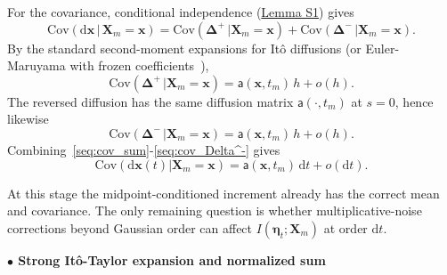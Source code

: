\documentclass[
 longbibliography,
 twocolumn,
 superscriptaddress,
 amsmath,
 amssymb,
 amsthm,
 amsfonts,
 prl,
 floatfix,
]{revtex4-2}
\newcommand{\matbf}[1]{\boldsymbol{\mathsf{#1}}}
\begin{document}
\begin{widetext}
For the covariance, conditional independence (\hyperlink{lem:S1}{Lemma S1}) gives
\begin{equation}
    \mathrm{Cov}(\mathrm{d}\bm{x}\,|\,\bm{X}_m=\bm{x})=
    \mathrm{Cov}(\bm\Delta^+\,|\bm{X}_m=\bm{x})
    +\mathrm{Cov}(\bm\Delta^-\,|\bm{X}_m=\bm{x}).
    \label{seq:cov_sum}
\end{equation}
By the standard second-moment expansions for Itô diffusions (or Euler-Maruyama with frozen coefficients~\cite{maruyama1955continuous,kloeden1992numerical}),
\begin{equation}
    \mathrm{Cov}(\bm\Delta^+\,|\bm{X}_m=\bm{x})
    =\matbf{a}(\bm{x},t_m)\,h+o(h).
    \label{seq:cov_Delta^+}
\end{equation}
The reversed diffusion has the same diffusion matrix $\matbf{a}(\cdot,t_m)$ at $s=0$, hence likewise
\begin{equation}
    \mathrm{Cov}(\bm\Delta^-\,|\bm{X}_m=\bm{x})
    =\matbf{a}(\bm{x},t_m)\,h+o(h).
    \label{seq:cov_Delta^-}
\end{equation}
Combining~\eqref{seq:cov_sum}-\eqref{seq:cov_Delta^-} gives
\begin{equation}
    \mathrm{Cov}(\mathrm{d}\bm{x}(t)|\bm{X}_m=\bm{x})=
    \matbf{a}(\bm{x},t_m)\,\mathrm{d}t+o(\mathrm{d}t).
    \label{seq:cal_cov_dx_xm}
\end{equation}


At this stage the midpoint-conditioned increment already has the correct mean and covariance. The only remaining question is whether multiplicative-noise corrections beyond Gaussian order can affect $I(\bm\eta_t;\bm X_m)$ at order $\mathrm dt$.

\bigskip
\noindent\textbf{$\bullet$ Strong It\^{o}-Taylor expansion and normalized sum}


\end{widetext}
\end{document}
